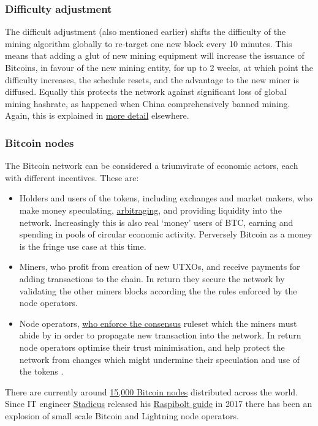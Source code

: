 \subsubsection{Difficulty adjustment}
The difficult adjustment (also mentioned earlier) shifts the difficulty of the mining algorithm globally to re-target one new block every 10 minutes. This means that adding a glut of new mining equipment will increase the issuance of Bitcoins, in favour of the new mining entity, for up to 2 weeks, at which point the difficulty increases, the schedule resets, and the advantage to the new miner is diffused. Equally this protects the network against significant loss of global mining hashrate, as happened when China comprehensively banned mining. Again, this is explained in \href{https://en.bitcoin.it/wiki/Difficulty}{more detail} elsewhere.
\subsubsection{Bitcoin nodes }
The Bitcoin network can be considered a triumvirate of economic actors, each with different incentives. These are:
\begin{itemize}
\item Holders and users of the tokens, including exchanges and market makers, who make money speculating, \href{https://en.wikipedia.org/wiki/Arbitrage}{arbitraging}, and providing liquidity into the network. Increasingly this is also real `money' users of BTC, earning and spending in pools of circular economic activity. Perversely Bitcoin as a money is the fringe use case at this time.
\item Miners, who profit from creation of new UTXOs, and receive payments for adding transactions to the chain. In return they secure the network by validating the other miners blocks according the the rules enforced by the node operators.
\item Node operators, \href{https://www.truthcoin.info/blog/measuring-decentralization/}{who enforce the consensus} ruleset which the miners must abide by in order to propagate new transaction into the network. In return node operators optimise their trust minimisation, and help protect the network from changes which might undermine their speculation and use of the tokens \cite{blocksizewars}.
\end{itemize}
There are currently around \href{https://bitnodes.io/}{15,000 Bitcoin nodes} distributed across the world. 
Since IT engineer \href{https://stadicus.com/}{Stadicus} released his \href{https://raspibolt.org/backstory.html}{Raspibolt guide} in 2017 there has been an explosion of small scale Bitcoin and Lightning node operators. 
